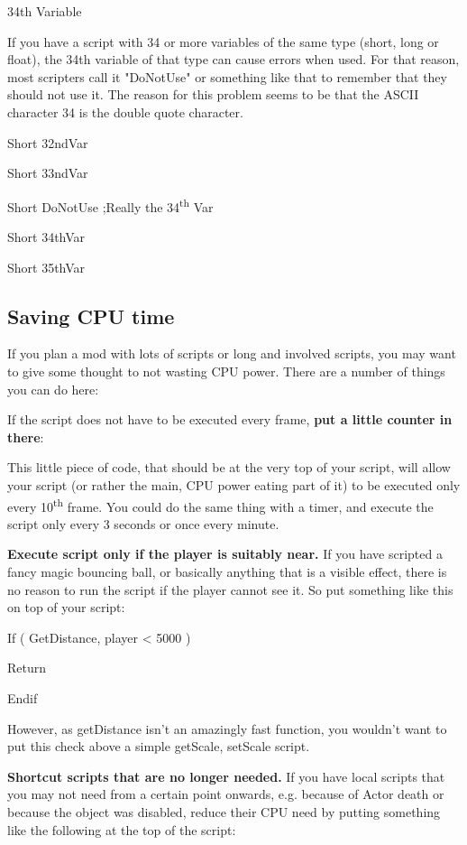 \documentclass[
]{article}
\begin{document}
34th Variable

If you have a script with 34 or more variables of the same type (short,
long or float), the 34th variable of that type can cause errors when
used. For that reason, most scripters call it "DoNotUse" or something
like that to remember that they should not use it. The reason for this
problem seems to be that the ASCII character 34 is the double quote
character.

Short 32ndVar

Short 33ndVar

Short DoNotUse ;Really the 34\textsuperscript{th} Var

Short 34thVar

Short 35thVar

\hypertarget{saving-cpu-time}{%
\subsection{\texorpdfstring{\hfill\break
Saving CPU time}{ Saving CPU time}}\label{saving-cpu-time}}

If you plan a mod with lots of scripts or long and involved scripts, you
may want to give some thought to not wasting CPU power. There are a
number of things you can do here:

If the script does not have to be executed every frame, \textbf{put a
little counter in there}:



This little piece of code, that should be at the very top of your
script, will allow your script (or rather the main, CPU power eating
part of it) to be executed only every 10\textsuperscript{th} frame. You
could do the same thing with a timer, and execute the script only every
3 seconds or once every minute.

\textbf{Execute script only if the player is suitably near.} If you have
scripted a fancy magic bouncing ball, or basically anything that is a
visible effect, there is no reason to run the script if the player
cannot see it. So put something like this on top of your script:

If ( GetDistance, player \textless{} 5000 )

Return

Endif

However, as getDistance isn't an amazingly fast function, you wouldn't
want to put this check above a simple getScale, setScale script.

\textbf{Shortcut scripts that are no longer needed.} If you have local
scripts that you may not need from a certain point onwards, e.g. because
of Actor death or because the object was disabled, reduce their CPU need
by putting something like the following at the top of the script:
\end{document}
